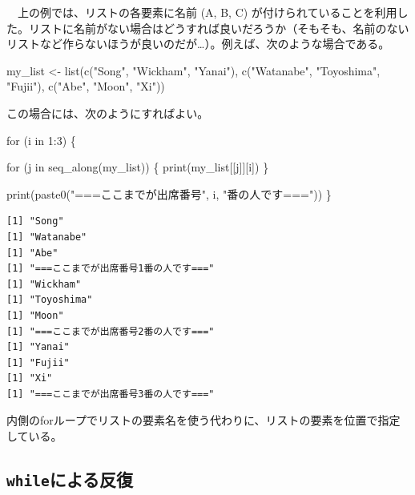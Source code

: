 \documentclass[
  a4paper,
  pandoc,
  ja=standard,
  jafont=haranoaji]{bxjsbook}
\newenvironment{Shaded}{\begin{snugshade}}{\end{snugshade}}
\newcommand{\ControlFlowTok}[1]{\textcolor[rgb]{0.00,0.48,0.65}{#1}}
\newcommand{\DecValTok}[1]{\textcolor[rgb]{0.68,0.00,0.00}{#1}}
\newcommand{\FunctionTok}[1]{\textcolor[rgb]{0.28,0.35,0.67}{#1}}
\newcommand{\NormalTok}[1]{\textcolor[rgb]{0.00,0.48,0.65}{#1}}
\newcommand{\OtherTok}[1]{\textcolor[rgb]{0.00,0.48,0.65}{#1}}
\newcommand{\SpecialCharTok}[1]{\textcolor[rgb]{0.37,0.37,0.37}{#1}}
\newcommand{\StringTok}[1]{\textcolor[rgb]{0.13,0.47,0.30}{#1}}
\begin{document}
　上の例では、リストの各要素に名前 (A, B, C)
が付けられていることを利用した。リストに名前がない場合はどうすれば良いだろうか（そもそも、名前のないリストなど作らないほうが良いのだが\ldots）。例えば、次のような場合である。

\begin{Shaded}
\begin{Highlighting}[numbers=left,,]
\NormalTok{my\_list }\OtherTok{\textless{}{-}} \FunctionTok{list}\NormalTok{(}\FunctionTok{c}\NormalTok{(}\StringTok{"Song"}\NormalTok{, }\StringTok{"Wickham"}\NormalTok{, }\StringTok{"Yanai"}\NormalTok{),}
                \FunctionTok{c}\NormalTok{(}\StringTok{"Watanabe"}\NormalTok{, }\StringTok{"Toyoshima"}\NormalTok{, }\StringTok{"Fujii"}\NormalTok{),}
                \FunctionTok{c}\NormalTok{(}\StringTok{"Abe"}\NormalTok{, }\StringTok{"Moon"}\NormalTok{, }\StringTok{"Xi"}\NormalTok{))}
\end{Highlighting}
\end{Shaded}

この場合には、次のようにすればよい。

\begin{Shaded}
\begin{Highlighting}[numbers=left,,]
\ControlFlowTok{for}\NormalTok{ (i }\ControlFlowTok{in} \DecValTok{1}\SpecialCharTok{:}\DecValTok{3}\NormalTok{) \{}
  
  \ControlFlowTok{for}\NormalTok{ (j }\ControlFlowTok{in} \FunctionTok{seq\_along}\NormalTok{(my\_list)) \{}
    \FunctionTok{print}\NormalTok{(my\_list[[j]][i])}
\NormalTok{  \}}
  
  \FunctionTok{print}\NormalTok{(}\FunctionTok{paste0}\NormalTok{(}\StringTok{"===ここまでが出席番号"}\NormalTok{, i, }\StringTok{"番の人です==="}\NormalTok{))}
\NormalTok{\}}
\end{Highlighting}
\end{Shaded}

\begin{verbatim}
[1] "Song"
[1] "Watanabe"
[1] "Abe"
[1] "===ここまでが出席番号1番の人です==="
[1] "Wickham"
[1] "Toyoshima"
[1] "Moon"
[1] "===ここまでが出席番号2番の人です==="
[1] "Yanai"
[1] "Fujii"
[1] "Xi"
[1] "===ここまでが出席番号3番の人です==="
\end{verbatim}

内側のforループでリストの要素名を使う代わりに、リストの要素を位置で指定している。

\hypertarget{whileux306bux3088ux308bux53cdux5fa9}{%
\subsection{\texorpdfstring{\texttt{while}による反復}{whileによる反復}}\label{whileux306bux3088ux308bux53cdux5fa9}}
\end{document}
